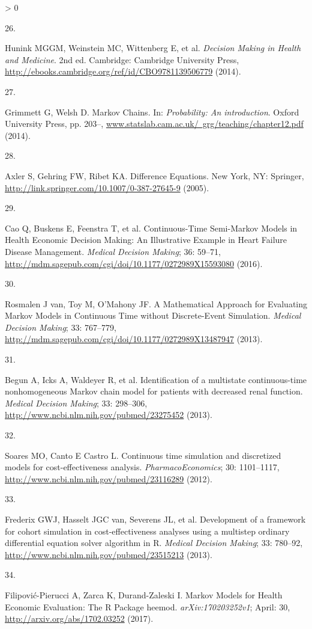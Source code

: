 \documentclass[
]{article}
\newlength{\cslhangindent}
\newlength{\csllabelwidth}
\newenvironment{CSLReferences}[2] %
 {%
  \setlength{\parindent}{0pt}
  \ifodd #1 \everypar{\setlength{\hangindent}{\cslhangindent}}\ignorespaces\fi
  \ifnum #2 > 0
  \setlength{\parskip}{#2\baselineskip}
  \fi
 }%
 {}
\newcommand{\CSLLeftMargin}[1]{\parbox[t]{\csllabelwidth}{#1}}
\newcommand{\CSLRightInline}[1]{\parbox[t]{\linewidth - \csllabelwidth}{#1}\break}
\begin{document}
\begin{CSLReferences}{0}{0}
\leavevmode\hypertarget{ref-Hunink2014}{}%
\CSLLeftMargin{26. }
\CSLRightInline{Hunink MGGM, Weinstein MC, Wittenberg E, et al. \emph{{Decision Making in Health and Medicine}}. 2nd ed. Cambridge: Cambridge University Press, \url{http://ebooks.cambridge.org/ref/id/CBO9781139506779} (2014).}

\leavevmode\hypertarget{ref-Grimmett2014}{}%
\CSLLeftMargin{27. }
\CSLRightInline{Grimmett G, Welsh D. {Markov Chains}. In: \emph{Probability: An introduction}. Oxford University Press, pp. 203--, \href{https://www.statslab.cam.ac.uk/\%C2\%A0grg/teaching/chapter12.pdf}{www.statslab.cam.ac.uk/~grg/teaching/chapter12.pdf} (2014).}

\leavevmode\hypertarget{ref-Axler2005}{}%
\CSLLeftMargin{28. }
\CSLRightInline{Axler S, Gehring FW, Ribet KA. {Difference Equations}. New York, NY: Springer, \url{http://link.springer.com/10.1007/0-387-27645-9} (2005).}

\leavevmode\hypertarget{ref-Cao2016}{}%
\CSLLeftMargin{29. }
\CSLRightInline{Cao Q, Buskens E, Feenstra T, et al. {Continuous-Time Semi-Markov Models in Health Economic Decision Making: An Illustrative Example in Heart Failure Disease Management}. \emph{Medical Decision Making}; 36: 59--71, \url{http://mdm.sagepub.com/cgi/doi/10.1177/0272989X15593080} (2016).}

\leavevmode\hypertarget{ref-VanRosmalen2013}{}%
\CSLLeftMargin{30. }
\CSLRightInline{Rosmalen J van, Toy M, O'Mahony JF. {A Mathematical Approach for Evaluating Markov Models in Continuous Time without Discrete-Event Simulation}. \emph{Medical Decision Making}; 33: 767--779, \url{http://mdm.sagepub.com/cgi/doi/10.1177/0272989X13487947} (2013).}

\leavevmode\hypertarget{ref-Begun2013}{}%
\CSLLeftMargin{31. }
\CSLRightInline{Begun A, Icks A, Waldeyer R, et al. {Identification of a multistate continuous-time nonhomogeneous Markov chain model for patients with decreased renal function.} \emph{Medical Decision Making}; 33: 298--306, \url{http://www.ncbi.nlm.nih.gov/pubmed/23275452} (2013).}

\leavevmode\hypertarget{ref-Soares2012}{}%
\CSLLeftMargin{32. }
\CSLRightInline{Soares MO, Canto E Castro L. {Continuous time simulation and discretized models for cost-effectiveness analysis}. \emph{PharmacoEconomics}; 30: 1101--1117, \url{http://www.ncbi.nlm.nih.gov/pubmed/23116289} (2012).}

\leavevmode\hypertarget{ref-Frederix2013a}{}%
\CSLLeftMargin{33. }
\CSLRightInline{Frederix GWJ, Hasselt JGC van, Severens JL, et al. {Development of a framework for cohort simulation in cost-effectiveness analyses using a multistep ordinary differential equation solver algorithm in R.} \emph{Medical Decision Making}; 33: 780--92, \url{http://www.ncbi.nlm.nih.gov/pubmed/23515213} (2013).}

\leavevmode\hypertarget{ref-Filipovic-Pierucci2017}{}%
\CSLLeftMargin{34. }
\CSLRightInline{Filipović-Pierucci A, Zarca K, Durand-Zaleski I. {Markov Models for Health Economic Evaluation: The R Package heemod}. \emph{arXiv:170203252v1}; April: 30, \url{http://arxiv.org/abs/1702.03252} (2017).}

\end{CSLReferences}
\end{document}

